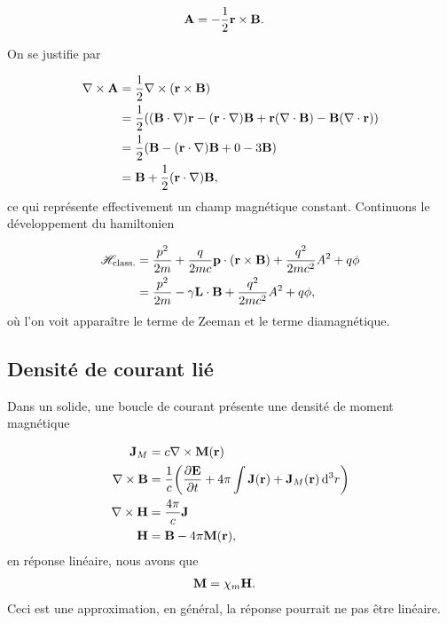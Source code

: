 \begin{align}
    \vb{A}&=-\frac12\vb{r}\times\vb{B}.
\end{align}

On se justifie par

\begin{align}
    \nabla\times\vb{A}&=\frac12\nabla\times(\vb{r}\times\vb{B})\\
                      &=\frac12\qty((\vb{B}\cdot\nabla)\vb{r}-(\vb{r}\cdot\nabla)\vb{B}
                      +\vb{r}(\nabla\cdot\vb{B})-\vb{B}(\nabla\cdot\vb{r}))\\
                      &=\frac12\qty(\vb{B}-(\vb{r}\cdot\nabla)\vb{B}+0-3\vb{B})\\
                    &=\vb{B}+\frac12(\vb{r}\cdot\nabla)\vb{B},
\end{align}
ce qui représente effectivement un champ magnétique constant. Continuons le
développement du hamiltonien

\begin{align}
    \mathscr{H}_{\rm class.}&=\frac{p^2}{2m}+\frac q{2mc}\vb{p}\cdot(\vb{r}\times\vb{B})
    +\frac{q^2}{2mc^2}A^2+q\phi\\
                            &=\frac{p^2}{2m}-\gamma\vb{L}\cdot\vb{B}+\frac{q^2}{2mc^2}
                            A^2+q\phi,
\end{align}
où l'on voit apparaître le terme de Zeeman et le terme diamagnétique.


\subsection{Densité de courant lié} %
\label{sub:Densité de courant lié}

Dans un solide, une boucle de courant présente une densité de moment magnétique

\begin{align}
    \vb{J}_{M}&=c\nabla\times\vb{M}(\vb{r})\\
    \nabla\times\vb{B}&=\frac1c\qty(\pdv{\vb{E}}{t}+4\pi\int\vb{J}(\vb{r})+\vb{J}_M(\vb{r})\dd[3]{r})\\
    \nabla\times\vb{H}&=\frac{4\pi}{c}\vb{J}\\
    \vb{H}&=\vb{B}-4\pi\vb{M}(\vb{r}),
\end{align}
en réponse linéaire, nous avons que
\begin{align}
    \vb{M}&=\chi_m\vb{H}.
\end{align}
Ceci est une approximation, en général, la réponse pourrait ne pas être linéaire.

